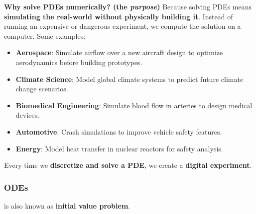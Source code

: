 \begin{deepeningbox}[: PDE]
    \highspace
    \textcolor{Green3}{ \textbf{Why solve PDEs numerically? (the \emph{purpose})}} Because solving PDEs means \textbf{simulating the real-world without physically building it}. Instead of running an expensive or dangerous experiment, we compute the solution on a computer. Some examples:
    \begin{itemize}
        \item \textbf{Aerospace}: Simulate airflow over a new aircraft design to optimize aerodynamics before building prototypes.
        \item \textbf{Climate Science}: Model global climate systems to predict future climate change scenarios.
        \item \textbf{Biomedical Engineering}: Simulate blood flow in arteries to design medical devices.
        \item \textbf{Automotive}: Crash simulations to improve vehicle safety features.
        \item \textbf{Energy}: Model heat transfer in nuclear reactors for safety analysis.
    \end{itemize}
    Every time we \textbf{discretize and solve a PDE}, we create a \textbf{digital experiment}.
\end{deepeningbox}

\newpage

\subsubsection{ODEs}

 is also known as \textbf{initial value problem}.

